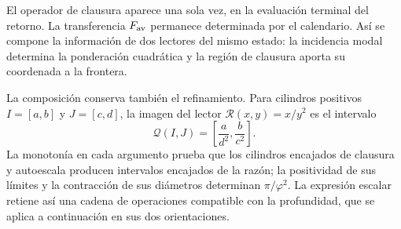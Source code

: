 El operador de clausura aparece una sola vez, en la evaluación terminal
del retorno. La transferencia \(F_{\rm av}\) permanece determinada
por el calendario. Así se compone la información de dos lectores del
mismo estado: la incidencia modal determina la ponderación cuadrática
y la región de clausura aporta su coordenada a la frontera.

La composición conserva también el refinamiento. Para cilindros positivos
\(I=[a,b]\) y \(J=[c,d]\), la imagen del lector
\(\mathcal R(x,y)=x/y^2\) es el intervalo
\[
 \mathcal Q(I,J)=\left[\frac{a}{d^2},\frac{b}{c^2}\right].
\]
La monotonía en cada argumento prueba que los cilindros encajados de
clausura y autoescala producen intervalos encajados de la razón; la
positividad de sus límites y la contracción de sus diámetros determinan
\(\pi/\varphi^2\). La expresión escalar retiene así una cadena
de operaciones compatible con la profundidad, que se aplica a
continuación en sus dos orientaciones.

